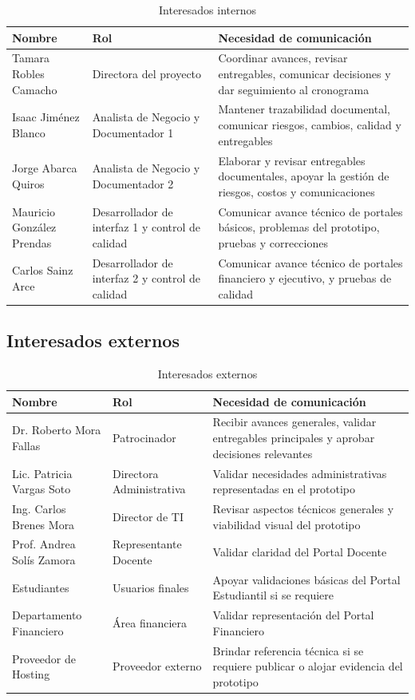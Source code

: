 \documentclass[11pt,spanish]{article}
\begin{document}
\begin{table}[H]
\centering
\caption{Interesados internos}
\label{tab:stakeholders-internos}
{\small
\begin{tabularx}{\textwidth}{p{3.7cm} p{4.1cm} Y}
\toprule
\textbf{Nombre} & \textbf{Rol} & \textbf{Necesidad de comunicación} \\
\midrule
Tamara Robles Camacho & Directora del proyecto & Coordinar avances, revisar entregables, comunicar decisiones y dar seguimiento al cronograma \\
Isaac Jiménez Blanco & Analista de Negocio y Documentador 1 & Mantener trazabilidad documental, comunicar riesgos, cambios, calidad y entregables \\
Jorge Abarca Quiros & Analista de Negocio y Documentador 2 & Elaborar y revisar entregables documentales, apoyar la gestión de riesgos, costos y comunicaciones \\
Mauricio González Prendas & Desarrollador de interfaz 1 y control de calidad & Comunicar avance técnico de portales básicos, problemas del prototipo, pruebas y correcciones \\
Carlos Sainz Arce & Desarrollador de interfaz 2 y control de calidad & Comunicar avance técnico de portales financiero y ejecutivo, y pruebas de calidad \\
\bottomrule
\end{tabularx}
}
\end{table}

\subsection{Interesados externos}

\begin{table}[H]
\centering
\caption{Interesados externos}
\label{tab:stakeholders-externos}
{\small
\begin{tabularx}{\textwidth}{p{3.7cm} p{3.9cm} Y}
\toprule
\textbf{Nombre} & \textbf{Rol} & \textbf{Necesidad de comunicación} \\
\midrule
Dr. Roberto Mora Fallas & Patrocinador & Recibir avances generales, validar entregables principales y aprobar decisiones relevantes \\
Lic. Patricia Vargas Soto & Directora Administrativa & Validar necesidades administrativas representadas en el prototipo \\
Ing. Carlos Brenes Mora & Director de TI & Revisar aspectos técnicos generales y viabilidad visual del prototipo \\
Prof. Andrea Solís Zamora & Representante Docente & Validar claridad del Portal Docente \\
Estudiantes & Usuarios finales & Apoyar validaciones básicas del Portal Estudiantil si se requiere \\
Departamento Financiero & Área financiera & Validar representación del Portal Financiero \\
Proveedor de Hosting & Proveedor externo & Brindar referencia técnica si se requiere publicar o alojar evidencia del prototipo \\
\bottomrule
\end{tabularx}
}
\end{table}
\end{document}
